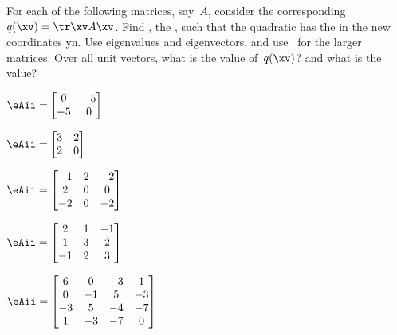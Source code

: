 \begin{exercise}  
For each of the following matrices, say~\(A\), consider the corresponding  \(q(\xv)=\tr\xv A\xv\).
Find , the , such that the quadratic has the  in the new coordinates \hlist yn.
Use eigenvalues and eigenvectors, and use \script\ for the larger matrices.
Over all unit vectors, what is the  value of~\(q(\xv)\)? and what is the  value?

\begin{Parts}
\item \(\eAii=\begin{bmatrix} 0&-5
\\-5&0 \end{bmatrix}\)

\begin{OmitV1}
\item \(\eAii=\begin{bmatrix} 3&2
\\2&0 \end{bmatrix}\)

\item \(\eAii=\begin{bmatrix} -1&2&-2
\\2&0&0
\\-2&0&-2 \end{bmatrix}\)
\end{OmitV1}

\item \(\eAii=\begin{bmatrix} 2&1&-1
\\1&3&2
\\-1&2&3 \end{bmatrix}\)

\item {\small%
\(\eAii=\begin{bmatrix} 6&0&-3&1
\\0&-1&5&-3
\\-3&5&-4&-7
\\1&-3&-7&0 \end{bmatrix}\)
}%


\end{Parts}
\end{exercise}
